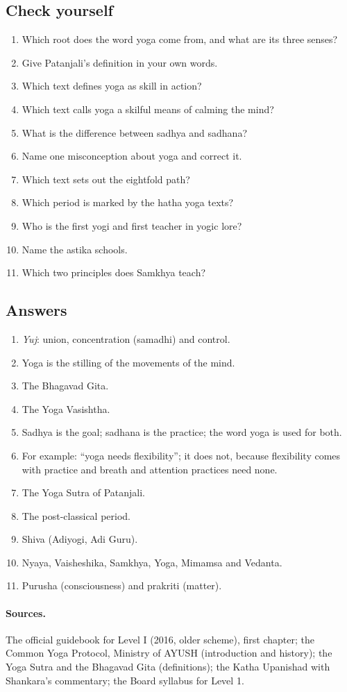 \subsection*{Check yourself}
\begin{enumerate}
\item Which root does the word yoga come from, and what are its three senses?
\item Give Patanjali's definition in your own words.
\item Which text defines yoga as skill in action?
\item Which text calls yoga a skilful means of calming the mind?
\item What is the difference between sadhya and sadhana?
\item Name one misconception about yoga and correct it.
\item Which text sets out the eightfold path?
\item Which period is marked by the hatha yoga texts?
\item Who is the first yogi and first teacher in yogic lore?
\item Name the astika schools.
\item Which two principles does Samkhya teach?
\end{enumerate}

\subsection*{Answers}
\begin{enumerate}
\item \emph{Yuj}: union, concentration (samadhi) and control.
\item Yoga is the stilling of the movements of the mind.
\item The Bhagavad Gita.
\item The Yoga Vasishtha.
\item Sadhya is the goal; sadhana is the practice; the word yoga is used for both.
\item For example: ``yoga needs flexibility''; it does not, because flexibility comes with practice and breath and attention practices need none.
\item The Yoga Sutra of Patanjali.
\item The post-classical period.
\item Shiva (Adiyogi, Adi Guru).
\item Nyaya, Vaisheshika, Samkhya, Yoga, Mimamsa and Vedanta.
\item Purusha (consciousness) and prakriti (matter).
\end{enumerate}

\paragraph{Sources.} The official guidebook for Level I (2016, older scheme), first chapter; the Common Yoga Protocol, Ministry of AYUSH (introduction and history); the Yoga Sutra and the Bhagavad Gita (definitions); the Katha Upanishad with Shankara's commentary; the Board syllabus for Level 1.
